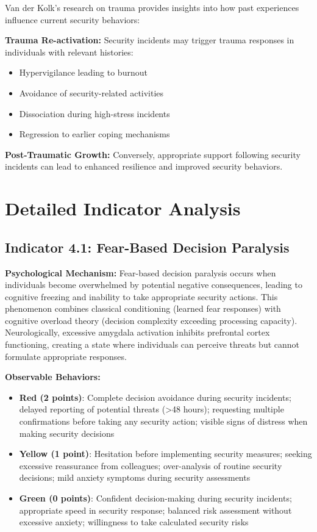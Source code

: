 \documentclass[11pt,a4paper]{article}
\begin{document}
Van der Kolk's research on trauma\cite{vanderkolk2014} provides insights into how past experiences influence current security behaviors:

\textbf{Trauma Re-activation:}
Security incidents may trigger trauma responses in individuals with relevant histories:
\begin{itemize}
\item Hypervigilance leading to burnout
\item Avoidance of security-related activities
\item Dissociation during high-stress incidents
\item Regression to earlier coping mechanisms
\end{itemize}

\textbf{Post-Traumatic Growth:}
Conversely, appropriate support following security incidents can lead to enhanced resilience and improved security behaviors.

\section{Detailed Indicator Analysis}

\subsection{Indicator 4.1: Fear-Based Decision Paralysis}

\textbf{Psychological Mechanism:}
Fear-based decision paralysis occurs when individuals become overwhelmed by potential negative consequences, leading to cognitive freezing and inability to take appropriate security actions. This phenomenon combines classical conditioning (learned fear responses) with cognitive overload theory (decision complexity exceeding processing capacity). Neurologically, excessive amygdala activation inhibits prefrontal cortex functioning, creating a state where individuals can perceive threats but cannot formulate appropriate responses\cite{ledoux2000}.

\textbf{Observable Behaviors:}
\begin{itemize}
\item \textbf{Red (2 points)}: Complete decision avoidance during security incidents; delayed reporting of potential threats (>48 hours); requesting multiple confirmations before taking any security action; visible signs of distress when making security decisions
\item \textbf{Yellow (1 point)}: Hesitation before implementing security measures; seeking excessive reassurance from colleagues; over-analysis of routine security decisions; mild anxiety symptoms during security assessments
\item \textbf{Green (0 points)}: Confident decision-making during security incidents; appropriate speed in security response; balanced risk assessment without excessive anxiety; willingness to take calculated security risks
\end{itemize}
\end{document}
